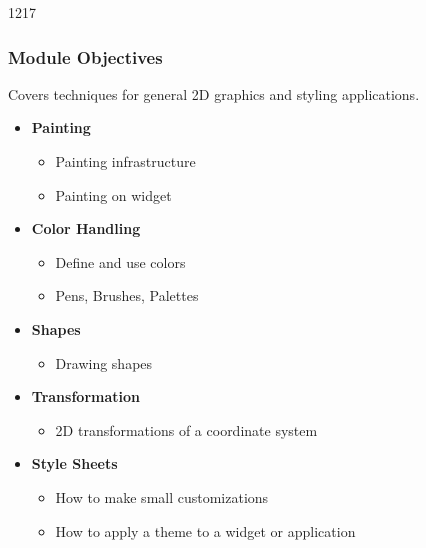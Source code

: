 \begin{slide}{1217}
\label{painting-and-drawing}
\frametitle{Module Objectives}

Covers techniques for general 2D graphics and styling applications.
\begin{itemize}
\item \textbf{Painting}
  \begin{itemize}
  \item Painting infrastructure
  \item Painting on widget
  \end{itemize}
\item \textbf{Color Handling}
  \begin{itemize}
  \item Define and use colors
  \item Pens, Brushes, Palettes
  \end{itemize}
\item \textbf{Shapes}
  \begin{itemize}
  \item Drawing shapes
  \end{itemize}
\item \textbf{Transformation}
  \begin{itemize}
  \item 2D transformations of a coordinate system
  \end{itemize}
\item \textbf{Style Sheets} 
  \begin{itemize}
  \item How to make small customizations
  \item How to apply a theme to a widget or application
  \end{itemize}
\end{itemize}

\end{slide}



 


